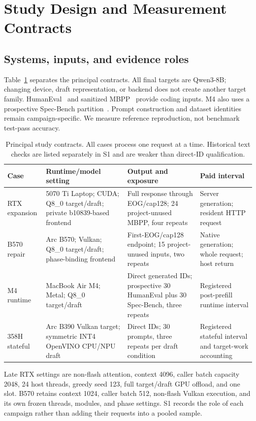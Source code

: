 \section{Study Design and Measurement Contracts}
\label{sec:methods}
\subsection{Systems, inputs, and evidence roles}
Table~\ref{tab:contracts} separates the principal contracts. All final targets are Qwen3-8B; changing device, draft representation, or backend does not create another target family. HumanEval~\cite{humaneval} and sanitized MBPP~\cite{mbpp} provide coding inputs. M4 also uses a prospective Spec-Bench partition~\cite{specbench}. Prompt construction and dataset identities remain campaign-specific. We measure reference reproduction, not benchmark test-pass accuracy.

\begin{table}[t]\centering\small
\caption{Principal study contracts. All cases process one request at a time. Historical text checks are listed separately in S1 and are weaker than direct-ID qualification.}
\label{tab:contracts}
\begin{tabularx}{\linewidth}{@{}p{.17\linewidth}p{.26\linewidth}XX@{}}\toprule
Case & Runtime/model setting & Output and exposure & Paid interval\\\midrule
RTX expansion & 5070 Ti Laptop; CUDA; Q8\_0 target/draft; private b10839-based frontend & Full response through EOG/cap128; 24 project-unused MBPP, four repeats & Server generation; resident HTTP request\\
B570 repair & Arc B570; Vulkan; Q8\_0 target/draft; phase-binding frontend & First-EOG/cap128 endpoint; 15 project-unused inputs, two repeats & Native generation; whole request; host return\\
M4 runtime & MacBook Air M4; Metal; Q8\_0 target/draft & Direct generated IDs; prospective 30 HumanEval plus 30 Spec-Bench, three repeats & Registered post-prefill runtime interval\\
358H stateful & Arc B390 Vulkan target; symmetric INT4 OpenVINO CPU/NPU draft & Direct IDs; 30 prompts, three repeats per draft condition & Registered stateful interval and target-work accounting\\\bottomrule
\end{tabularx}
\end{table}

Late RTX settings are non-flash attention, context 4096, caller batch capacity 2048, 24 host threads, greedy seed 123, full target/draft GPU offload, and one slot. B570 retains context 1024, caller batch 512, non-flash Vulkan execution, and its own frozen threads, modules, and phase settings. S1 records the role of each campaign rather than adding their requests into a pooled sample.

